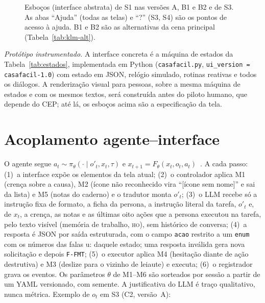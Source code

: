 \documentclass[conference]{IEEEtran}
\newcommand{\stHO}{\textsc{ho}}
\begin{document}
\begin{figure}[!t]
\caption{Esboços (interface abstrata) de S1 nas versões A, B1 e B2 e de S3. As abas ``Ajuda'' (todas as telas) e ``?'' (S3, S4) são os pontos de acesso à ajuda. B1 e B2 são as alternativas da cena principal (Tabela~\ref{tab:klm-alt}).}
\label{fig:wire}
\end{figure}

\textit{Protótipo instrumentado.} A interface concreta é a máquina de estados da Tabela~\ref{tab:estados}, implementada em Python (\texttt{casafacil.py}, \texttt{ui\_version = casafacil-1.0}) com estado em JSON, relógio simulado, rotinas reativas e todos os diálogos. A renderização visual para pessoas, sobre a mesma máquina de estados e com os mesmos textos, será construída antes do piloto humano, que depende do CEP; até lá, os esboços acima são a especificação da tela.

\section{Acoplamento agente--interface}\label{sec:acoplamento}

O agente segue $a_t \sim \pi_\theta(\cdot \mid o'_t, x_t, \tau)$ e $x_{t+1} = F_\theta(x_t, o_t, a_t)$~\cite{lacerda2026faseII}. A cada passo: (1)~a interface expõe os elementos da tela atual; (2)~o controlador aplica M1 (crença sobre a causa), M2 (ícone não reconhecido vira ``[ícone sem nome]'' e sai da lista) e M5 (notas do caderno) e o tradutor monta $o'_t$; (3)~o LLM recebe só a instrução fixa de formato, a ficha da persona, a instrução literal da tarefa, $o'_t$ e, de $x_t$, a crença, as notas e as últimas oito ações que a persona executou na tarefa, pelo texto visível (memória de trabalho, \stHO), sem histórico de conversa; (4)~a resposta é JSON por saída estruturada, com o campo \texttt{acao} restrito a um \texttt{enum} com os números das falas u: daquele estado; uma resposta inválida gera nova solicitação e depois \texttt{F-FMT}; (5)~o executor aplica M4 (hesitação diante de ação destrutiva) e M3 (deslize para o vizinho de leiaute) e executa; (6)~o registrador grava os eventos. Os parâmetros $\theta$ de M1--M6 são sorteados por sessão a partir de um YAML versionado, com semente. A justificativa do LLM é traço qualitativo, nunca métrica. Exemplo de $o_t$ em S3 (C2, versão~A):
\end{document}
